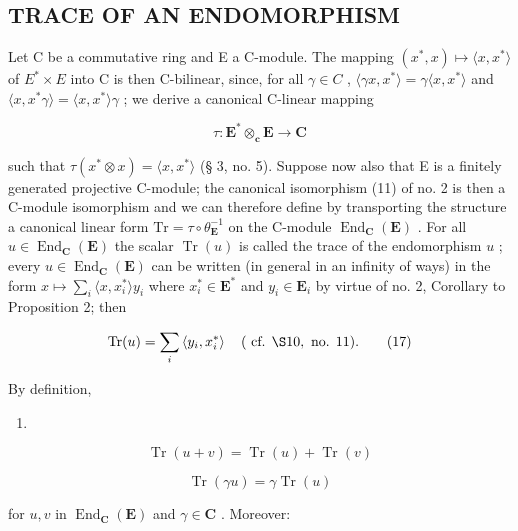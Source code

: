 \subsection{TRACE OF AN ENDOMORPHISM}

Let C be a commutative ring and E a C-module. The mapping \((x^{*}, x) \mapsto \langle x, x^{*} \rangle\) of \(E^{*} \times E\) into C is then C-bilinear, since, for all \(\gamma \in C\) , \(\langle \gamma x, x^{*} \rangle = \gamma \langle x, x^{*} \rangle\) and \(\langle x, x^{*} \gamma \rangle = \langle x, x^{*} \rangle \gamma\) ; we derive a canonical C-linear mapping

\[
\tau : \mathbf {E} ^ {*} \otimes_ {\mathbf {c}} \mathbf {E} \rightarrow \mathbf {C}\tag{16}
\]

such that \(\tau(x^{*} \otimes x) = \langle x, x^{*} \rangle\) (§ 3, no. 5). Suppose now also that E is a finitely generated projective C-module; the canonical isomorphism (11) of no. 2 is then a C-module isomorphism and we can therefore define by transporting the structure a canonical linear form \(\mathrm{Tr} = \tau \circ \theta_{\mathbf{E}}^{-1}\) on the C-module \(\operatorname{End}_{\mathbf{C}}(\mathbf{E})\) . For all \(u \in \operatorname{End}_{\mathbf{C}}(\mathbf{E})\) the scalar \(\operatorname{Tr}(u)\) is called the trace of the endomorphism \(u\) ; every \(u \in \operatorname{End}_{\mathbf{C}}(\mathbf{E})\) can be written (in general in an infinity of ways) in the form \(x \mapsto \sum_{i} \langle x, x_{i}^{*} \rangle y_{i}\) where \(x_{i}^{*} \in \mathbf{E}^{*}\) and \(y_{i} \in \mathbf{E}_{i}\) by virtue of no. 2, Corollary to Proposition 2; then

\[
\operatorname{Tr} (u) = \sum_ {i} \left\langle y _ {i}, x _ {i} ^ {*} \right\rangle \quad (\text { cf. } \S 1 0, \text { no. } 1 1).\tag{17}
\]

By definition,

\begin{enumerate}
\def\labelenumi{(\arabic{enumi})}
\setcounter{enumi}{17}
\tightlist
\item
\end{enumerate}

\[
\operatorname{Tr} (u + v) = \operatorname{Tr} (u) + \operatorname{Tr} (v)\tag{19}
\]

\[
\operatorname{Tr} (\gamma u) = \gamma \operatorname{Tr} (u)
\]

for \(u, v\) in \(\operatorname{End}_{\mathbf{C}}(\mathbf{E})\) and \(\gamma \in \mathbf{C}\) . Moreover:

